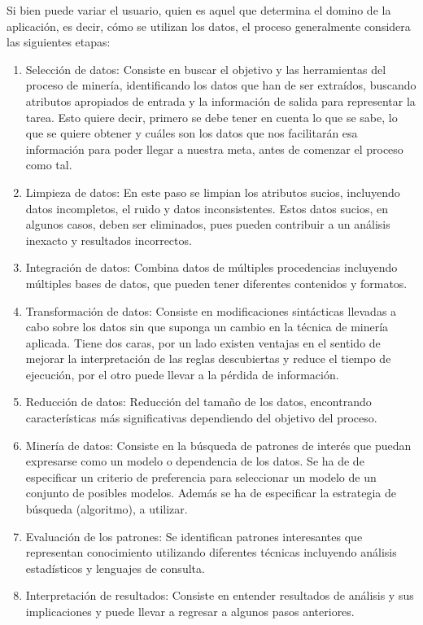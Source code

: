 Si bien puede variar el usuario, quien es aquel que determina el domino de la aplicación, es decir, cómo se utilizan los datos, el proceso generalmente considera las siguientes etapas:

\begin{enumerate}
\item Selección de datos: Consiste en buscar el objetivo y las herramientas del proceso de minería, identificando los datos que han de ser extraídos, buscando atributos apropiados de entrada y la información de salida para representar la tarea. Esto quiere decir, primero se debe tener en cuenta lo que se sabe, lo que se quiere obtener y cuáles son los datos que nos facilitarán esa información para poder llegar a nuestra meta, antes de comenzar el proceso como tal.
\item Limpieza de datos: En este paso se limpian los atributos sucios, incluyendo datos incompletos, el ruido y datos inconsistentes. Estos datos sucios, en algunos casos, deben ser eliminados, pues pueden contribuir a un análisis inexacto y resultados incorrectos.
\item Integración de datos: Combina datos de múltiples procedencias incluyendo múltiples bases de datos, que pueden tener diferentes contenidos y formatos.
\item Transformación de datos: Consiste en modificaciones sintácticas llevadas a cabo sobre los datos sin que suponga un cambio en la técnica de minería aplicada. Tiene dos caras, por un lado existen ventajas en el sentido de mejorar la interpretación de las reglas descubiertas y reduce el tiempo de ejecución, por el otro puede llevar a la pérdida de información.
\item Reducción de datos: Reducción del tamaño de los datos, encontrando características más significativas dependiendo del objetivo del proceso.
\item Minería de datos: Consiste en la búsqueda de patrones de interés que puedan expresarse como un modelo o dependencia de los datos. Se ha de de especificar un criterio de preferencia para seleccionar un modelo de un conjunto de posibles modelos. Además se ha de especificar la estrategia de búsqueda (algoritmo), a utilizar.
\item Evaluación de los patrones: Se identifican patrones interesantes que representan conocimiento utilizando diferentes técnicas incluyendo análisis estadísticos y lenguajes de consulta.
\item Interpretación de resultados: Consiste en entender resultados de análisis y sus implicaciones y puede llevar a regresar a algunos pasos anteriores.
\end{enumerate}

